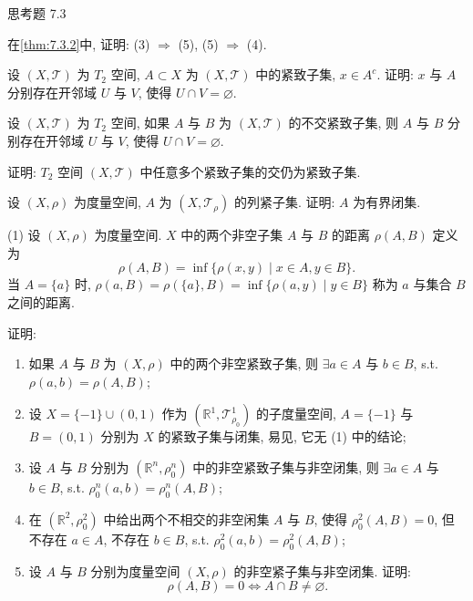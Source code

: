 \begin{exblock}{思考题 7.3}

  \item 在\cref{thm:7.3.2}中, 证明: (3) $\Rightarrow$ (5), (5) $\Rightarrow$ (4).

  \item 设 $(X, \mathcal{T})$ 为 $T_{2}$ 空间, $A \subset X$ 为 $(X, \mathcal{T})$ 中的紧致子集, $x \in A^{c}$. 证明: $x$ 与 $A$ 分别存在开邻域 $U$ 与 $V$, 使得 $U \cap V = \varnothing$.

  \item 设 $(X, \mathcal{T})$ 为 $T_{2}$ 空间, 如果 $A$ 与 $B$ 为 $(X, \mathcal{T})$ 的不交紧致子集, 则 $A$ 与 $B$ 分别存在开邻域 $U$ 与 $V$, 使得 $U \cap V = \varnothing$.

  \item 证明: $T_{2}$ 空间 $(X, \mathcal{T})$ 中任意多个紧致子集的交仍为紧致子集.

  \item 设 $(X, \rho)$ 为度量空间, $A$ 为 $(X, \mathcal{T}_{\rho})$ 的列紧子集. 证明: $A$ 为有界闭集.

  \item (1) 设 $(X, \rho)$ 为度量空间. $X$ 中的两个非空子集 $A$ 与 $B$ 的距离 $\rho(A, B)$ 定义为
  \[
    \rho(A, B) = \inf\{\rho(x, y) \mid x \in A, y \in B\}.
  \]
  当 $A = \{a\}$ 时, $\rho(a, B) = \rho(\{a\}, B) = \inf\{\rho(a, y) \mid y \in B\}$ 称为 $a$ 与集合 $B$ 之间的距离.

  证明:
  \begin{enumerate}
    \item 如果 $A$ 与 $B$ 为 $(X, \rho)$ 中的两个非空紧致子集, 则 $\exists a \in A$ 与 $b \in B$, s.t. $\rho(a, b) = \rho(A, B)$;

    \item 设 $X = \{-1\} \cup (0, 1)$ 作为 $(\mathbb{R}^{1}, \mathcal{T}_{\rho_{0}}^{1})$ 的子度量空间, $A = \{-1\}$ 与 $B = (0, 1)$ 分别为 $X$ 的紧致子集与闭集, 易见, 它无 (1) 中的结论;

    \item 设 $A$ 与 $B$ 分别为 $(\mathbb{R}^{n}, \rho_{0}^{n})$ 中的非空紧致子集与非空闭集, 则 $\exists a \in A$ 与 $b \in B$, s.t. $\rho_{0}^{n}(a, b) = \rho_{0}^{n}(A, B)$;

    \item 在 $(\mathbb{R}^{2}, \rho_{0}^{2})$ 中给出两个不相交的非空闲集 $A$ 与 $B$, 使得 $\rho_{0}^{2}(A, B) = 0$, 但不存在 $a \in A$, 不存在 $b \in B$, s.t. $\rho_{0}^{2}(a, b) = \rho_{0}^{2}(A, B)$;

    \item 设 $A$ 与 $B$ 分别为度量空间 $(X, \rho)$ 的非空紧子集与非空闭集. 证明:
    \[
      \rho(A, B) = 0 \iff A \cap B \neq \varnothing.
    \]
  \end{enumerate}


\end{exblock}
